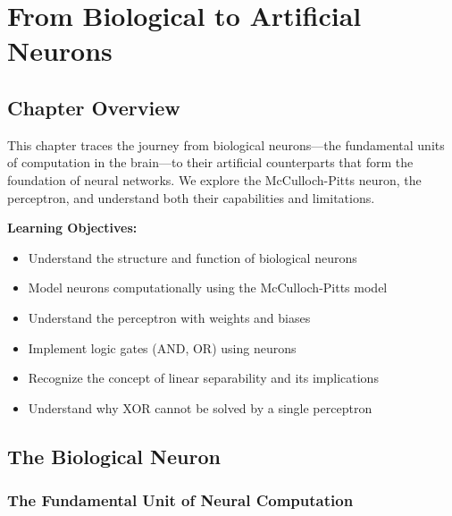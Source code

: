 
\chapter{From Biological to Artificial Neurons}
\label{ch:neurons}


\section{Chapter Overview}

This chapter traces the journey from biological neurons---the fundamental units of computation in the brain---to their artificial counterparts that form the foundation of neural networks. We explore the McCulloch-Pitts neuron, the perceptron, and understand both their capabilities and limitations.

\textbf{Learning Objectives:}
\begin{itemize}
    \item Understand the structure and function of biological neurons
    \item Model neurons computationally using the McCulloch-Pitts model
    \item Understand the perceptron with weights and biases
    \item Implement logic gates (AND, OR) using neurons
    \item Recognize the concept of linear separability and its implications
    \item Understand why XOR cannot be solved by a single perceptron
\end{itemize}


\section{The Biological Neuron}

\subsection{The Fundamental Unit of Neural Computation}

